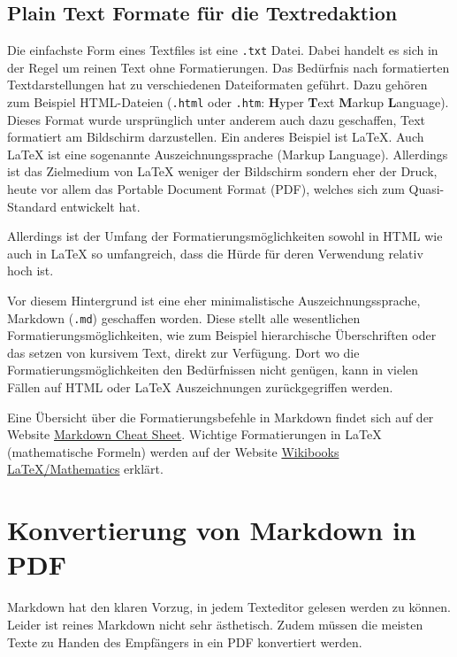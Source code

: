 \documentclass[
  nswissgerman,
  a4paper,
  DIV=11,
  numbers=noendperiod,
  ngerman]{scrreprt}
\begin{document}
\section{Plain Text Formate für die
Textredaktion}\label{plain-text-formate-fuxfcr-die-textredaktion}

Die einfachste Form eines Textfiles ist eine \texttt{.txt} Datei. Dabei
handelt es sich in der Regel um reinen Text ohne Formatierungen. Das
Bedürfnis nach formatierten Textdarstellungen hat zu verschiedenen
Dateiformaten geführt. Dazu gehören zum Beispiel HTML-Dateien
(\texttt{.html} oder \texttt{.htm}: \textbf{H}yper \textbf{T}ext
\textbf{M}arkup \textbf{L}anguage). Dieses Format wurde ursprünglich
unter anderem auch dazu geschaffen, Text formatiert am Bildschirm
darzustellen. Ein anderes Beispiel ist LaTeX. Auch LaTeX ist eine
sogenannte Auszeichnungssprache (Markup Language). Allerdings ist das
Zielmedium von LaTeX weniger der Bildschirm sondern eher der Druck,
heute vor allem das Portable Document Format (PDF), welches sich zum
Quasi-Standard entwickelt hat.

Allerdings ist der Umfang der Formatierungsmöglichkeiten sowohl in HTML
wie auch in LaTeX so umfangreich, dass die Hürde für deren Verwendung
relativ hoch ist.

Vor diesem Hintergrund ist eine eher minimalistische
Auszeichnungssprache, Markdown (\texttt{.md}) geschaffen worden. Diese
stellt alle wesentlichen Formatierungsmöglichkeiten, wie zum Beispiel
hierarchische Überschriften oder das setzen von kursivem Text, direkt
zur Verfügung. Dort wo die Formatierungsmöglichkeiten den Bedürfnissen
nicht genügen, kann in vielen Fällen auf HTML oder LaTeX Auszeichnungen
zurückgegriffen werden.

Eine Übersicht über die Formatierungsbefehle in Markdown findet sich auf
der Website \href{https://www.markdownguide.org/cheat-sheet/}{Markdown
Cheat Sheet}. Wichtige Formatierungen in LaTeX (mathematische Formeln)
werden auf der Website
\href{https://en.wikibooks.org/wiki/LaTeX/Mathematics}{Wikibooks
LaTeX/Mathematics} erklärt.

\chapter{Konvertierung von Markdown in
PDF}\label{konvertierung-von-markdown-in-pdf}

Markdown hat den klaren Vorzug, in jedem Texteditor gelesen werden zu
können. Leider ist reines Markdown nicht sehr ästhetisch. Zudem müssen
die meisten Texte zu Handen des Empfängers in ein PDF konvertiert
werden.
\end{document}

